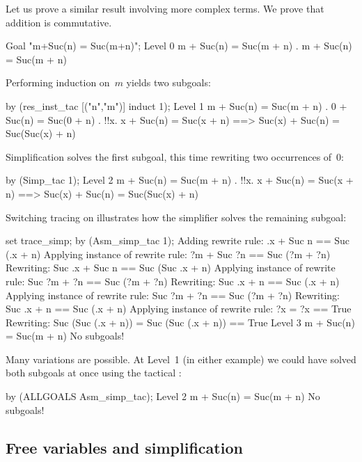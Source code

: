 Let us prove a similar result involving more complex terms.  We prove
that addition is commutative.
\begin{ttbox}
Goal "m+Suc(n) = Suc(m+n)";
{\out Level 0}
{\out m + Suc(n) = Suc(m + n)}
{. m + Suc(n) = Suc(m + n)}
\end{ttbox}
Performing induction on~$m$ yields two subgoals:
\begin{ttbox}
by (res_inst_tac [("n","m")] induct 1);
{\out Level 1}
{\out m + Suc(n) = Suc(m + n)}
{. 0 + Suc(n) = Suc(0 + n)}
{. !!x. x + Suc(n) = Suc(x + n) ==>}
{\out          Suc(x) + Suc(n) = Suc(Suc(x) + n)}
\end{ttbox}
Simplification solves the first subgoal, this time rewriting two
occurrences of~0:
\begin{ttbox}
by (Simp_tac 1);
{\out Level 2}
{\out m + Suc(n) = Suc(m + n)}
{. !!x. x + Suc(n) = Suc(x + n) ==>}
{\out          Suc(x) + Suc(n) = Suc(Suc(x) + n)}
\end{ttbox}
Switching tracing on illustrates how the simplifier solves the remaining
subgoal: 
\begin{ttbox}
set trace_simp;
by (Asm_simp_tac 1);
\ttbreak
{\out Adding rewrite rule:}
{\out .x + Suc n == Suc (.x + n)}
\ttbreak
{\out Applying instance of rewrite rule:}
{\out ?m + Suc ?n == Suc (?m + ?n)}
{\out Rewriting:}
{\out Suc .x + Suc n == Suc (Suc .x + n)}
\ttbreak
{\out Applying instance of rewrite rule:}
{\out Suc ?m + ?n == Suc (?m + ?n)}
{\out Rewriting:}
{\out Suc .x + n == Suc (.x + n)}
\ttbreak
{\out Applying instance of rewrite rule:}
{\out Suc ?m + ?n == Suc (?m + ?n)}
{\out Rewriting:}
{\out Suc .x + n == Suc (.x + n)}
\ttbreak
{\out Applying instance of rewrite rule:}
{\out ?x = ?x == True}
{\out Rewriting:}
{\out Suc (Suc (.x + n)) = Suc (Suc (.x + n)) == True}
\ttbreak
{\out Level 3}
{\out m + Suc(n) = Suc(m + n)}
{\out No subgoals!}
\end{ttbox}
Many variations are possible.  At Level~1 (in either example) we could have
solved both subgoals at once using the tactical :
\begin{ttbox}
by (ALLGOALS Asm_simp_tac);
{\out Level 2}
{\out m + Suc(n) = Suc(m + n)}
{\out No subgoals!}
\end{ttbox}


\subsection{Free variables and simplification}

